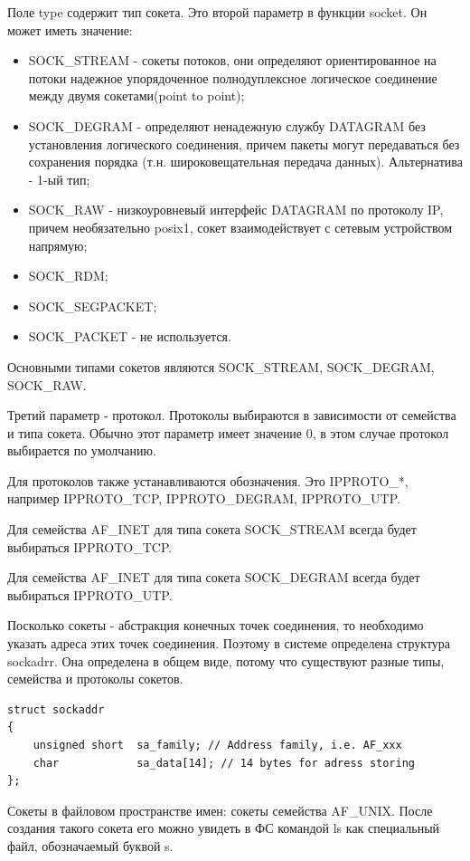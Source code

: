 \documentclass[12pt,a4paper]{scrreprt}
\begin{document}
Поле type содержит тип сокета. Это второй параметр в функции socket. Он может иметь значение:

\begin{itemize}
	\item SOCK\_STREAM - сокеты потоков, они определяют ориентированное на потоки надежное упорядоченное полнодуплексное логическое соединение между двумя сокетами(point to point);
	\item SOCK\_DEGRAM - определяют ненадежную службу DATAGRAM без установления логического соединения, причем пакеты могут передаваться без сохранения порядка (т.н. широковещательная передача данных). Альтернатива - 1-ый тип;
	\item SOCK\_RAW - низкоуровневый интерфейс DATAGRAM по протоколу IP, причем необязательно posix1, сокет взаимодействует с сетевым устройством напрямую;
	\item SOCK\_RDM;
	\item SOCK\_SEGPACKET;
	\item SOCK\_PACKET - не используется.
\end{itemize}

Основными типами сокетов являются SOCK\_STREAM, SOCK\_DEGRAM, SOCK\_RAW.

Третий параметр - протокол. Протоколы выбираются в зависимости от семейства и типа сокета. Обычно этот параметр имеет значение 0, в этом случае протокол выбирается по умолчанию. 

Для протоколов также устанавливаются обозначения. Это IPPROTO\_*, например IPPROTO\_TCP, IPPROTO\_DEGRAM, IPPROTO\_UTP.

Для семейства AF\_INET для типа сокета SOCK\_STREAM всегда будет выбираться IPPROTO\_TCP.

Для семейства AF\_INET для типа сокета SOCK\_DEGRAM всегда будет выбираться IPPROTO\_UTP.

Посколько сокеты - абстракция конечных точек соединения, то необходимо указать адреса этих точек соединения. Поэтому в системе определена структура sockadrr. Она определена в общем виде, потому что существуют разные типы, семейства и протоколы сокетов.

\begin{lstlisting}
struct sockaddr 
{ 
	unsigned short  sa_family; // Address family, i.e. AF_xxx 
	char 			sa_data[14]; // 14 bytes for adress storing
};
\end{lstlisting}

Сокеты в файловом пространстве имен: сокеты семейства AF\_UNIX. После создания такого сокета его можно увидеть в ФС командой ls как специальный файл, обозначаемый буквой s. 
\end{document}
